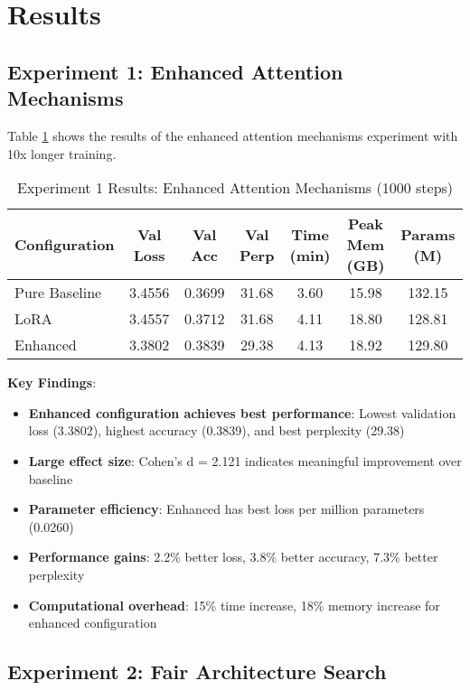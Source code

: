 \documentclass[11pt,a4paper]{article}
\begin{document}
\section{Results}

\subsection{Experiment 1: Enhanced Attention Mechanisms}

Table \ref{tab:exp1_results} shows the results of the enhanced attention mechanisms experiment with 10x longer training.

\begin{table}[H]
\centering
\caption{Experiment 1 Results: Enhanced Attention Mechanisms (1000 steps)}
\label{tab:exp1_results}
\begin{tabular}{@{}lcccccc@{}}
\toprule
Configuration & Val Loss & Val Acc & Val Perp & Time (min) & Peak Mem (GB) & Params (M) \\
\midrule
Pure Baseline & 3.4556 & 0.3699 & 31.68 & 3.60 & 15.98 & 132.15 \\
LoRA & 3.4557 & 0.3712 & 31.68 & 4.11 & 18.80 & 128.81 \\
Enhanced & 3.3802 & 0.3839 & 29.38 & 4.13 & 18.92 & 129.80 \\
\bottomrule
\end{tabular}
\end{table}

\textbf{Key Findings}:
\begin{itemize}
    \item \textbf{Enhanced configuration achieves best performance}: Lowest validation loss (3.3802), highest accuracy (0.3839), and best perplexity (29.38)
    \item \textbf{Large effect size}: Cohen's d = 2.121 indicates meaningful improvement over baseline
    \item \textbf{Parameter efficiency}: Enhanced has best loss per million parameters (0.0260)
    \item \textbf{Performance gains}: 2.2\% better loss, 3.8\% better accuracy, 7.3\% better perplexity
    \item \textbf{Computational overhead}: 15\% time increase, 18\% memory increase for enhanced configuration
\end{itemize}

\subsection{Experiment 2: Fair Architecture Search}
\end{document}
